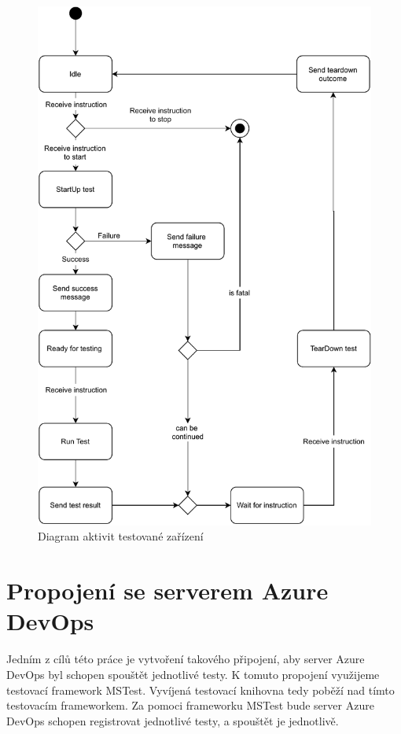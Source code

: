 \begin{figure}
    \centering 
    \includegraphics[width=\textwidth]{assets/img/activitydiagramdevice.pdf}
    \caption{Diagram aktivit testované zařízení}
    \label{fig:act_diag_device}
\end{figure}

\section{Propojení se serverem Azure DevOps}
Jedním z cílů této práce je vytvoření takového připojení, aby server Azure DevOps byl schopen spouštět jednotlivé testy. K tomuto propojení využijeme testovací framework MSTest. Vyvíjená testovací knihovna tedy poběží nad tímto testovacím frameworkem. Za pomoci frameworku MSTest bude server Azure DevOps schopen registrovat jednotlivé testy, a spouštět je jednotlivě.

